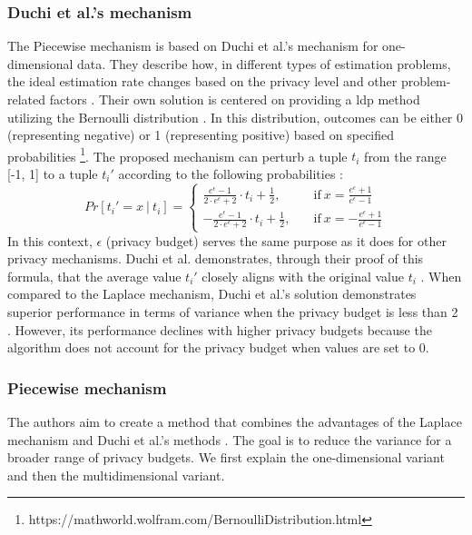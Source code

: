 \subsubsection{Duchi et al.'s mechanism}
The Piecewise mechanism is based on Duchi et al.'s mechanism for one-dimensional data.
They describe how, in different types of estimation problems, the ideal estimation rate changes based on the privacy level and other problem-related factors \citep{duchi_minimax_2017}.
Their own solution is centered on providing a \gls{ldp} method utilizing the Bernoulli distribution \citep{duchi_minimax_2017}. 
In this distribution, outcomes can be either 0 (representing negative) or 1 (representing positive) based on specified probabilities \footnote{https://mathworld.wolfram.com/BernoulliDistribution.html}. \newline
The proposed mechanism can perturb a tuple $t_i$ from the range [-1, 1] to a tuple $t_i'$ according to the following probabilities \citep{wang_collecting_2019}:
\begin{equation}
    Pr [t_i' = x \ | \ t_i ] = 
    \begin{cases}
        \frac{e^\epsilon - 1}{2 \cdot e^\epsilon + 2} \cdot t_i + \frac{1}{2}, & \quad \text{if} \ x = \frac{e^\epsilon + 1}{e^\epsilon - 1} \\
        - \frac{e^\epsilon - 1}{2 \cdot e^\epsilon + 2} \cdot t_i + \frac{1}{2}, & \quad \text{if} \ x = - \frac{e^\epsilon + 1}{e^\epsilon - 1}
    \end{cases}
\end{equation}
In this context, $\epsilon$ (privacy budget) serves the same purpose as it does for other privacy mechanisms.
Duchi et al. demonstrates, through their proof of this formula, that the average value $t_i'$ closely aligns with the original value $t_i$ \citep{duchi_minimax_2017, wang_collecting_2019}.
When compared to the Laplace mechanism, Duchi et al.'s solution demonstrates superior performance in terms of variance when the privacy budget is less than 2 \citep{wang_collecting_2019}. 
However, its performance declines with higher privacy budgets because the algorithm does not account for the privacy budget when values are set to 0.

\subsubsection*{Piecewise mechanism} \label{theory:piecewise}
The authors aim to create a method that combines the advantages of the Laplace mechanism and Duchi et al.'s methods \citep{wang_collecting_2019}.
The goal is to reduce the variance for a broader range of privacy budgets.
We first explain the one-dimensional variant and then the multidimensional variant. \newpage

